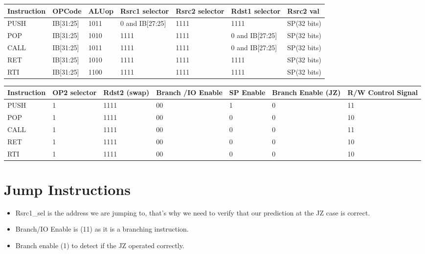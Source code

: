 \begin{center}
\begin{tabular}{||p{20mm}| p{15mm}| p{15mm}| p{15mm}| p{15mm}| p{15mm}| p{15mm}||} 
\hline
Instruction & OPCode & ALUop & Rsrc1 selector & Rsrc2 selector & Rdst1 selector & Rsrc2 val \\ [0.5ex] 
\hline\hline
PUSH & IB[31:25] & 1011 & 0 and IB[27:25] & 1111 & 1111 & SP(32 bits) \\
\hline
POP & IB[31:25] & 1010 & 1111 & 1111 & 0 and IB[27:25] & SP(32 bits) \\
\hline
CALL & IB[31:25] & 1011 & 1111 & 1111 & 0 and IB[27:25] & SP(32 bits) \\
\hline
RET & IB[31:25] & 1010 & 1111 & 1111 & 1111 & SP(32 bits) \\
\hline
RTI & IB[31:25] & 1100 & 1111 & 1111 & 1111 & SP(32 bits) \\
\hline
\end{tabular}
\end{center}

\begin{center}
\begin{tabular}{||p{20mm}| p{15mm}| p{15mm}| p{15mm}| p{15mm}| p{15mm}| p{15mm}||} 
\hline
Instruction & OP2 selector & Rdst2 (swap) & Branch /IO Enable & SP Enable & Branch Enable (JZ) & R/W Control Signal \\ [0.5ex] 
\hline\hline
PUSH & 1 & 1111 & 00 & 1 & 0 & 11 \\
\hline
POP & 1 & 1111 & 00 & 0 & 0 & 10 \\
\hline
CALL & 1 & 1111 & 00 & 0 & 0 & 11 \\
\hline
RET & 1 & 1111 & 00 & 0 & 0 & 10 \\
\hline
RTI & 1 & 1111 & 00 & 0 & 0 & 10 \\
\hline
\end{tabular}
\end{center}

\section{Jump Instructions}
\begin{itemize}
    \item Rsrc1\_sel is the address we are jumping to, that's why we need to verify that our prediction at the JZ case is correct.
    \item Branch/IO Enable is (11) as it is a branching instruction.
    \item Branch enable (1) to detect if the JZ operated correctly.
\end{itemize}

